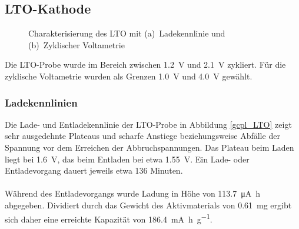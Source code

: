 \documentclass[a4paper, 11pt, headsepline,footsepline,twoside,abstract]{scrbook}
\begin{document}
\subsection{LTO-Kathode}
\begin{figure}[htb!]
   \centering
       \vspace{3mm}
       \vspace{3mm}
	\caption{Charakterisierung des LTO mit (a)~Ladekennlinie und (b)~Zyklischer Voltametrie}
   	\label{ec_LTO}
\end{figure}
Die LTO-Probe wurde im Bereich zwischen \SI{1.2}{\volt} und \SI{2.1}{\volt} zykliert. Für die zyklische Voltametrie wurden als Grenzen \SI{1.0}{\volt} und \SI{4.0}{\volt} gewählt.
\subsubsection{Ladekennlinien}
Die Lade- und Entladekennlinie der LTO-Probe in Abbildung \ref{gcpl_LTO} zeigt sehr ausgedehnte Plateaus und scharfe Anstiege beziehungsweise Abfälle der Spannung vor dem Erreichen der Abbruchspannungen. Das Plateau beim Laden liegt bei \SI{1.6}{\volt}, das beim Entladen bei etwa \SI{1.55}{\volt}. Ein Lade- oder Entladevorgang dauert jeweils etwa 136 Minuten.
\\\\
Während des Entladevorgangs wurde Ladung in Höhe von \SI{113.7}{\micro\ampere\hour} abgegeben. Dividiert durch das Gewicht des Aktivmaterials von \SI{0.61}{\milli\gram} ergibt sich daher eine erreichte Kapazität von \SI{186.4}{\milli\ampere\hour\per\gram}.
\end{document}
